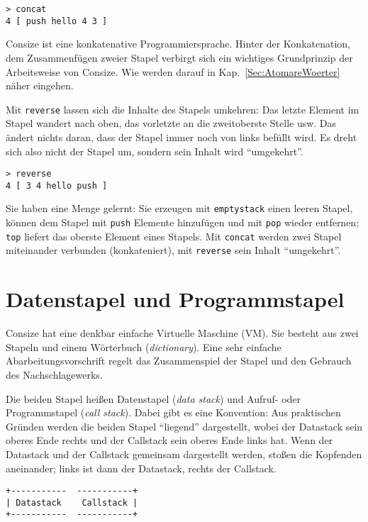 \begin{verbatim}
> concat
4 [ push hello 4 3 ]
\end{verbatim}

Consize ist eine konkatenative Programmiersprache. Hinter der Konkatenation, dem Zusammenfügen zweier Stapel verbirgt sich ein wichtiges Grundprinzip der Arbeitsweise von Consize. Wie werden darauf in Kap.~\ref{Sec:AtomareWoerter} näher eingehen.

Mit \verb|reverse| lassen sich die Inhalte des Stapels umkehren: Das letzte Element im Stapel wandert nach oben, das vorletzte an die zweitoberste Stelle usw. Das ändert nichts daran, dass der Stapel immer noch von links befüllt wird. Es dreht sich also nicht der Stapel um, sondern sein Inhalt wird "`umgekehrt"'.

\begin{verbatim}
> reverse
4 [ 3 4 hello push ]
\end{verbatim}

Sie haben eine Menge gelernt: Sie erzeugen mit \verb|emptystack| einen leeren Stapel, können dem Stapel mit \verb|push| Elemente hinzufügen und mit \verb|pop| wieder entfernen; \verb|top| liefert das oberste Element eines Stapels. Mit \verb|concat| werden zwei Stapel miteinander verbunden (konkateniert), mit \verb|reverse| sein Inhalt "`umgekehrt"'.

\section{Datenstapel und Programmstapel}
\label{Sec:DataCallStack}

Consize hat eine denkbar einfache Virtuelle Maschine (VM). Sie besteht aus zwei Stapeln und einem Wörterbuch (\emph{dictionary}). Eine sehr einfache Abarbeitungsvorschrift regelt das Zusammenspiel der Stapel und den Gebrauch des Nachschlagewerks.

Die beiden Stapel heißen Datenstapel (\emph{data stack}) und Aufruf- oder Programmstapel (\emph{call stack}). Dabei gibt es eine Konvention: Aus praktischen Gründen werden die beiden Stapel "`liegend"' dargestellt, wobei der Datastack sein oberes Ende rechts und der Callstack sein oberes Ende links hat. Wenn der Datastack und der Callstack gemeinsam dargestellt werden, stoßen die Kopfenden aneinander; links ist dann der Datastack, rechts der Callstack.

\begin{verbatim}
+-----------  -----------+
| Datastack    Callstack |
+-----------  -----------+
\end{verbatim}

